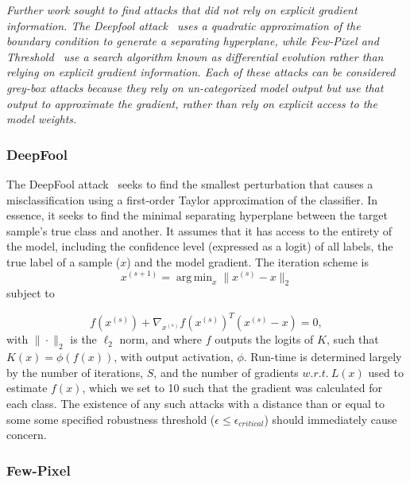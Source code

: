 \documentclass[journal]{IEEEtran}
\DeclareMathOperator*{\argmin}{arg\,min}
\newcommand{\cm}[1]{\textit{{\color{blue}#1}}}
\begin{document}
\cm{
Further work sought to find attacks that did not rely on explicit gradient information. The \textit{Deepfool} attack~\cite{deepfool} uses a quadratic approximation of the boundary condition to generate a separating hyperplane, while \textit{Few-Pixel} and \textit{Threshold}~\cite{pixelattack} use a search algorithm known as differential evolution rather than relying on explicit gradient information. Each of these attacks can be considered \textit{grey-box} attacks because they rely on un-categorized model output but use that output to approximate the gradient, rather than rely on explicit access to the model weights.
}



\subsubsection{DeepFool}

The DeepFool attack~\cite{deepfool} seeks to find the smallest perturbation that causes a misclassification using a first-order Taylor approximation of the classifier. In essence, it seeks to find the minimal separating hyperplane between the target sample's true class and another. It assumes that it has access to the entirety of the model, including the confidence level (expressed as a logit) of all labels, the true label of a sample ($x$) and the model gradient. The iteration scheme is
$$
    x^{(s+1)} = \argmin_x \|x^{(s)} - x\|_2 
$$
subject to 

$$
f(x^{(s)}) + \nabla_{x^{(s)}} f(x^{(s)})^T(x^{(s)} - x) = 0,
$$
with $\|\cdot\|_2$ is the $\ell_2$ norm, and where $f$ outputs the logits of $K$, such that $K(x) = \phi(f(x))$, with output activation, $\phi$. Run-time is determined largely by the number of iterations, $S$, and the number of gradients $w.r.t.~L(x)$ used to estimate $f(x)$, which we set to 10 such that the gradient was calculated for each class. The existence of any such attacks with a distance than or equal to some some specified robustness threshold ($\epsilon \leq \epsilon_{critical}$) should immediately cause concern.

\subsubsection{Few-Pixel}
\end{document}
